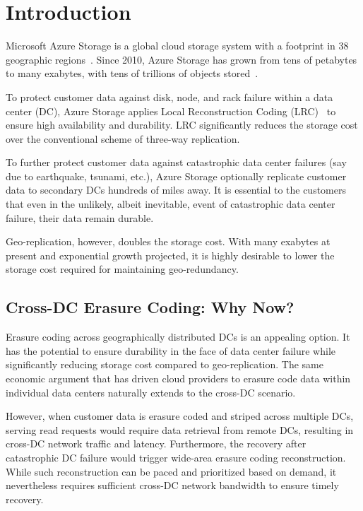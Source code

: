 \section{Introduction}

Microsoft Azure Storage is a global cloud storage system with a footprint in 38 geographic
regions~\cite{bib:azureregions}. Since 2010, Azure Storage has grown from tens of
petabytes to many exabytes, with tens of trillions of objects stored~\cite{greenberg15sdn}.

To protect customer data against disk, node, and rack failure within a data
center (DC), Azure Storage applies Local Reconstruction Coding (LRC)~\cite{huang12erasure}
to ensure high availability and durability. 
LRC significantly reduces the storage cost over the conventional scheme of
three-way replication.

To further protect customer data against catastrophic data center failures
(say due to earthquake, tsunami, etc.),
Azure Storage optionally replicate customer data to secondary DCs hundreds of miles away.
It is essential to the customers that even in the unlikely, albeit inevitable,
event of catastrophic data center failure, their data remain durable.

Geo-replication, however, doubles the storage cost.
With many exabytes at present and exponential growth projected,
it is highly desirable to lower the storage cost
required for maintaining geo-redundancy.



\subsection{Cross-DC Erasure Coding: Why Now?}

Erasure coding across geographically distributed DCs is an appealing option.
It has the potential to ensure durability in the face of data center failure
while significantly reducing storage cost compared to geo-replication.
The same economic argument that has driven cloud providers to erasure code data
within individual data centers naturally extends to the cross-DC scenario.

However, when customer data is erasure coded and striped across multiple DCs, 
serving read requests would require data retrieval from remote DCs, resulting in
cross-DC network traffic and latency. Furthermore, the recovery after catastrophic
DC failure would trigger wide-area erasure coding reconstruction. While such
reconstruction can be paced and prioritized based on demand, it nevertheless
requires sufficient cross-DC network bandwidth to ensure timely recovery.

